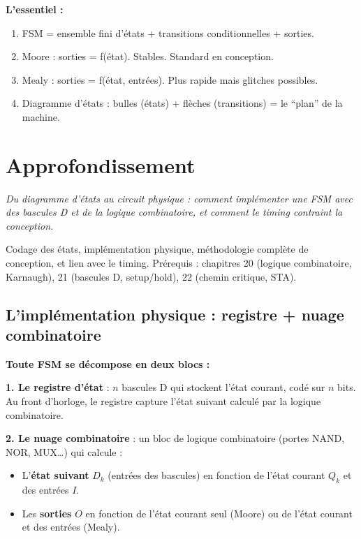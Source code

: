 \documentclass[12pt,a4paper,twoside]{book}
\begin{document}
\begin{retenir}
\textbf{L'essentiel :}
\begin{enumerate}[nosep]
\item FSM = ensemble fini d'états + transitions conditionnelles + sorties.
\item Moore : sorties = f(état). Stables. Standard en conception.
\item Mealy : sorties = f(état, entrées). Plus rapide mais glitches possibles.
\item Diagramme d'états : bulles (états) + flèches (transitions) = le ``plan'' de la machine.
\end{enumerate}
\end{retenir}

\section{Approfondissement}

\vspace{0.3cm}
\textit{Du diagramme d'états au circuit physique : comment implémenter une FSM avec des bascules D et de la logique combinatoire, et comment le timing contraint la conception.}
\vspace{0.3cm}

\begin{approfondissement}
Codage des états, implémentation physique, méthodologie complète de conception, et lien avec le timing. Prérequis : chapitres 20 (logique combinatoire, Karnaugh), 21 (bascules D, setup/hold), 22 (chemin critique, STA).
\end{approfondissement}

\subsection{L'implémentation physique : registre + nuage combinatoire}

\begin{formule}
\textbf{Toute FSM se décompose en deux blocs :}

\textbf{1. Le registre d'état} : $n$ bascules D qui stockent l'état courant, codé sur $n$ bits. Au front d'horloge, le registre capture l'état suivant calculé par la logique combinatoire.

\textbf{2. Le nuage combinatoire} : un bloc de logique combinatoire (portes NAND, NOR, MUX\ldots) qui calcule :
\begin{itemize}[nosep]
\item L'\textbf{état suivant} $D_k$ (entrées des bascules) en fonction de l'état courant $Q_k$ et des entrées $I$.
\item Les \textbf{sorties} $O$ en fonction de l'état courant seul (Moore) ou de l'état courant et des entrées (Mealy).
\end{itemize}
\end{formule}
\end{document}
